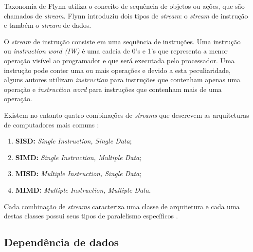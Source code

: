 \documentclass[12pt]{article}
\begin{document}
Taxonomia de Flynn utiliza o conceito de sequência de objetos ou ações, que são
chamados de \textit{stream}.
Flynn introduziu dois tipos de \textit{stream}: o 
\textit{stream} de instrução e também o \textit{stream} de dados. 

O \textit{stream} de instrução consiste em uma sequência de instruções. 
Uma instrução ou \textit{instruction word (IW)} é uma cadeia de 0's e 1's que 
representa a menor operação visível ao programador e que será executada pelo 
processador. 
Uma instrução pode conter uma ou mais operações e devido a esta peculiaridade,
alguns autores utilizam \textit{instruction} para instruções que contenham 
apenas uma operação e \textit{instruction word} para instruções que contenham 
mais de uma operação.

Existem no entanto quatro combinações de \textit{streams} que descrevem as 
arquiteturas de computadores mais comuns \cite{Flynn:1996}:

\begin{enumerate}
        \item \textbf{SISD:} \textit{Single Instruction, Single Data};
        \item \textbf{SIMD:} \textit{Single Instruction, Multiple Data};
        \item \textbf{MISD:} \textit{Multiple Instruction, Single Data};
        \item \textbf{MIMD:} \textit{Multiple Instruction, Multiple Data}.
\end{enumerate}

Cada combinação de \textit{streams} caracteriza uma classe de arquitetura 
e cada uma destas classes possui seus tipos de paralelismo específicos \cite{eopc}.

\subsection{Dependência de dados}
\end{document}
